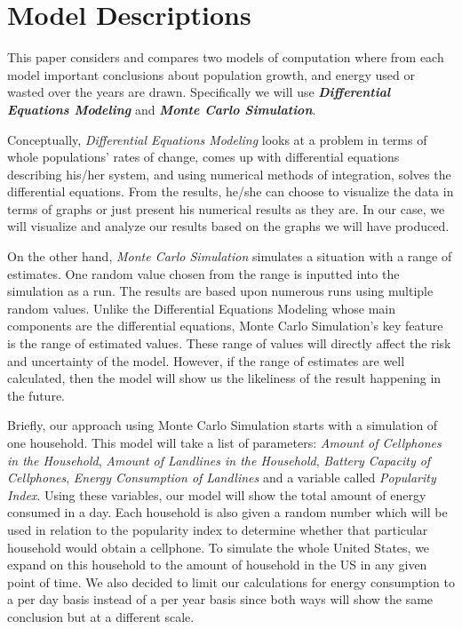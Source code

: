 \documentclass{article}
\begin{document}
\section{Model Descriptions}
This paper considers and compares two models of computation where from each model important conclusions about population growth, and energy used or wasted over the years are drawn. Specifically we will use \textbf{\textit{Differential Equations Modeling}}  and \textbf{\textit{Monte Carlo Simulation}}. \par
Conceptually, \textit{Differential Equations Modeling} looks at a problem in terms of whole populations' rates of change, comes up with differential equations describing his/her system, and using numerical methods of integration, solves the differential equations. From the results, he/she can choose to visualize the data in terms of graphs or just present his numerical results as they  are. In our case, we will visualize and analyze our results based on the graphs we will have produced.\par 
On the other hand, \textit{Monte Carlo Simulation} simulates a situation with a range of estimates. One random value chosen from the range is inputted into the simulation as a run. The results are based upon numerous runs using multiple random values. Unlike the Differential Equations Modeling whose main components are the differential equations, Monte Carlo Simulation's key feature is the range of estimated values. These range of values will directly affect the risk and uncertainty of the model. However, if the range of estimates are well calculated, then the model will show us the likeliness of the result happening in the future.\par
Briefly, our approach using Monte Carlo Simulation starts with a simulation of one household. This model will take a list of parameters: \textit{Amount of Cellphones in the Household}, \textit{Amount of Landlines in the Household}, \textit{Battery Capacity of Cellphones}, \textit{Energy Consumption of Landlines} and a variable called \textit{Popularity Index}. Using these variables, our model will show the total amount of energy consumed in a day. Each household is also given a random number which will be used in relation to the popularity index to determine whether that particular household would obtain a cellphone. To simulate the whole United States, we expand on this household to the amount of household in the US in any given point of time. We also decided to limit our calculations for energy consumption to a per day basis instead of a per year basis since both ways will show the same conclusion but at a different scale.\par
\end{document}
